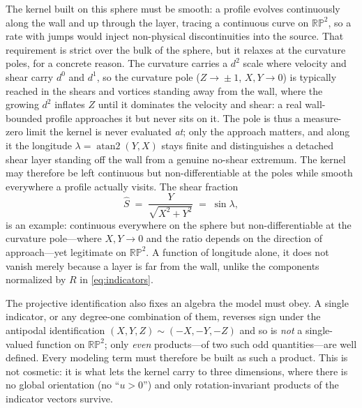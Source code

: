 \documentclass[journal]{new-aiaa}
\begin{document}
The kernel built on this sphere must be smooth: a profile evolves continuously
along the wall and up through the layer, tracing a continuous curve on
$\mathbb{RP}^2$, so a rate with jumps would inject non-physical discontinuities
into the source. That requirement is strict over the bulk of the sphere, but it
relaxes at the curvature poles, for a concrete reason. The curvature carries a
$d^2$ scale where velocity and shear carry $d^0$ and $d^1$, so the curvature
pole ($Z\!\to\!\pm1$, $X,Y\!\to\!0$) is typically reached in the shears and
vortices standing away from the wall, where the growing $d^2$ inflates $Z$ until
it dominates the velocity and shear: a real wall-bounded profile approaches it
but never sits on it. The pole is thus a
measure-zero limit the kernel is never evaluated \emph{at}; only the approach
matters, and along it the longitude $\lambda=\operatorname{atan2}(Y,X)$ stays
finite and distinguishes a detached shear layer standing off the wall from a
genuine no-shear extremum. The kernel may therefore be left continuous but
non-differentiable at the poles while smooth everywhere a profile actually
visits. The shear fraction
\begin{equation}
  \hat S \;=\; \frac{Y}{\sqrt{X^2+Y^2}} \;=\; \sin\lambda,
  \label{eq:shat}
\end{equation}
is an example: continuous everywhere on the sphere but non-differentiable at the
curvature pole---where $X,Y\!\to\!0$ and the ratio depends on the direction of
approach---yet legitimate on $\mathbb{RP}^2$. A function of longitude alone, it
does not vanish merely because a layer is far from the wall, unlike the
components normalized by $R$ in \eqref{eq:indicators}.

The projective identification also fixes an algebra the model must obey. A
single indicator, or any degree-one combination of them, reverses sign under
the antipodal identification $(X,Y,Z)\!\sim\!(-X,-Y,-Z)$ and so is \emph{not} a
single-valued function on $\mathbb{RP}^2$; only \emph{even} products---of two
such odd quantities---are well defined. Every modeling term must therefore be
built as such a product. This is not cosmetic: it is what lets the kernel carry
to three dimensions, where there is no global orientation (no ``$u>0$'') and
only rotation-invariant products of the indicator vectors survive.
\end{document}
